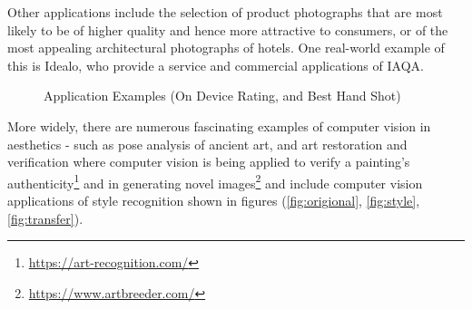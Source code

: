 Other applications include the selection of product photographs that are most likely to be of higher quality and hence more attractive to consumers, or of the most appealing architectural photographs of hotels. One real-world example of this is Idealo\cite{idealo2021}, who provide a service and commercial applications of IAQA\cite{Talebi2018,Lennan2018}. 

\begin{figure}[ht!]
    \centering
    \hfill
    \hfill
    \label{fig:on device}
    \hfill
    \hfill
    \caption{Application Examples (On Device Rating, and Best Hand Shot)}
    \label{fig:on device}
\end{figure}

More widely, there are numerous fascinating examples of computer vision in aesthetics - such as pose analysis of ancient art, and art restoration and verification where computer vision is being applied to verify a painting's authenticity\footnote{\href{https://art-recognition.com/}{https://art-recognition.com/}}\cite{Snow2017} and in generating novel images\footnote{\href{https://www.artbreeder.com/}{https://www.artbreeder.com/}} and include computer vision applications of style recognition\cite{Cheng2021} shown in figures (\ref{fig:origional}, \ref{fig:style}, \ref{fig:transfer}).

